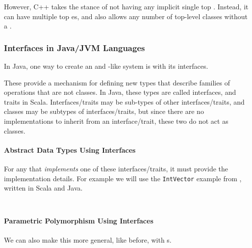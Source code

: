 However, C++ takes the stance of not having any implicit single top .
Instead, it can have multiple top es, and also allows any number of top-level classes without a .

\subsubsection{Interfaces in Java/JVM Languages}\label{subsubsec:Java_Interfaces}
In Java, one way to create an  and -like system is with its interfaces.

These provide a mechanism for defining new types that describe families of operations that are not classes.
In Java, these types are called interfaces, and traits in Scala.
Interfaces/traits may be sub-types of other interfaces/traits, and classes may be subtypes of interfaces/traits, but since there are no implementations to inherit from an interface/trait, these two do not act as classes.

\paragraph{Abstract Data Types Using Interfaces}\label{par:OOP_ADTs_Interfaces}
For any  that \emph{implements} one of these interfaces/traits, it must provide the implementation details.
For example we will use the \texttt{IntVector} example from , written in Scala and Java.
\inputminted[frame=lines,linenos]{scala}{./EDAP05-Concepts_Programming_Languages-Sections/Object_Oriented_Programming/Code/IntVector.scala}
\inputminted[frame=lines,linenos]{scala}{./EDAP05-Concepts_Programming_Languages-Sections/Object_Oriented_Programming/Code/IntVector.java}

\paragraph{Parametric Polymorphism Using Interfaces}\label{par:OOP_Parametric_Polymorphism_Interfaces}
We can also make this more general, like before, with s.
\inputminted[frame=lines,linenos]{scala}{./EDAP05-Concepts_Programming_Languages-Sections/Object_Oriented_Programming/Code/Vector.scala}
\inputminted[frame=lines,linenos]{scala}{./EDAP05-Concepts_Programming_Languages-Sections/Object_Oriented_Programming/Code/Vector.java}

